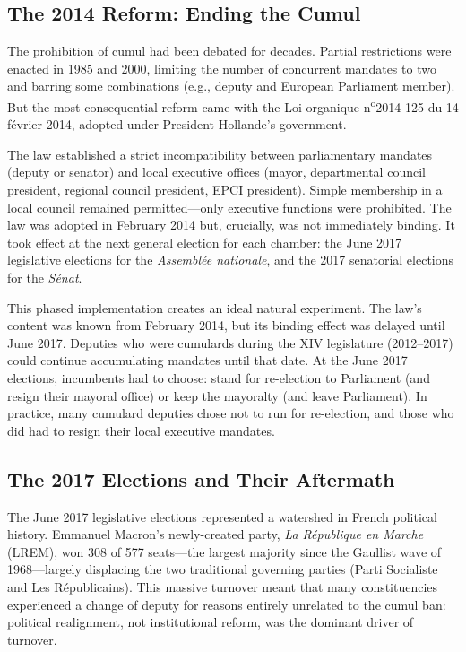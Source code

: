 \documentclass[12pt]{article}
\begin{document}
\subsection{The 2014 Reform: Ending the Cumul}

The prohibition of cumul had been debated for decades. Partial restrictions were enacted in 1985 and 2000, limiting the number of concurrent mandates to two and barring some combinations (e.g., deputy and European Parliament member). But the most consequential reform came with the Loi organique n\textsuperscript{o}2014-125 du 14 février 2014, adopted under President Hollande's government.

The law established a strict incompatibility between parliamentary mandates (deputy or senator) and local executive offices (mayor, departmental council president, regional council president, EPCI president). Simple membership in a local council remained permitted---only executive functions were prohibited. The law was adopted in February 2014 but, crucially, was not immediately binding. It took effect at the next general election for each chamber: the June 2017 legislative elections for the \textit{Assemblée nationale}, and the 2017 senatorial elections for the \textit{Sénat}.

This phased implementation creates an ideal natural experiment. The law's content was known from February 2014, but its binding effect was delayed until June 2017. Deputies who were cumulards during the XIV legislature (2012--2017) could continue accumulating mandates until that date. At the June 2017 elections, incumbents had to choose: stand for re-election to Parliament (and resign their mayoral office) or keep the mayoralty (and leave Parliament). In practice, many cumulard deputies chose not to run for re-election, and those who did had to resign their local executive mandates.

\subsection{The 2017 Elections and Their Aftermath}

The June 2017 legislative elections represented a watershed in French political history. Emmanuel Macron's newly-created party, \textit{La République en Marche} (LREM), won 308 of 577 seats---the largest majority since the Gaullist wave of 1968---largely displacing the two traditional governing parties (Parti Socialiste and Les Républicains). This massive turnover meant that many constituencies experienced a change of deputy for reasons entirely unrelated to the cumul ban: political realignment, not institutional reform, was the dominant driver of turnover.
\end{document}
